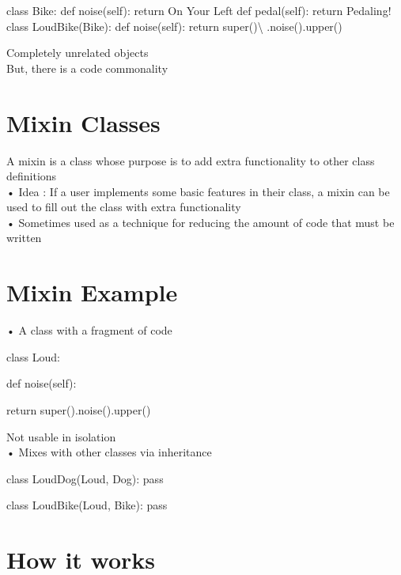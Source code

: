 \documentclass[
  letterpaper,
  DIV=11,
  numbers=noendperiod]{scrreprt}
\newenvironment{Shaded}{\begin{snugshade}}{\end{snugshade}}
\newcommand{\NormalTok}[1]{\textcolor[rgb]{0.00,0.23,0.31}{#1}}
\begin{document}
\begin{Shaded}
\begin{Highlighting}[]
\NormalTok{class Bike: def noise(self): return \textquotesingle{}On Your Left\textquotesingle{} def pedal(self): return \textquotesingle{}Pedaling!\textquotesingle{} class LoudBike(Bike): def noise(self): return super()\textbackslash{} .noise().upper() }
\end{Highlighting}
\end{Shaded}

Completely unrelated objects\\
But, there is a code commonality


\chapter{Mixin Classes}\label{mixin-classes}

A mixin is a class whose purpose is to add extra functionality to other
class definitions\\
• Idea : If a user implements some basic features in their class, a
mixin can be used to fill out the class with extra functionality\\
• Sometimes used as a technique for reducing the amount of code that
must be written


\chapter{Mixin Example}\label{mixin-example}

• A class with a fragment of code

class Loud:

def noise(self):

return super().noise().upper()

Not usable in isolation\\
• Mixes with other classes via inheritance

class LoudDog(Loud, Dog): pass

class LoudBike(Loud, Bike): pass


\chapter{How it works}\label{how-it-works}
\end{document}
